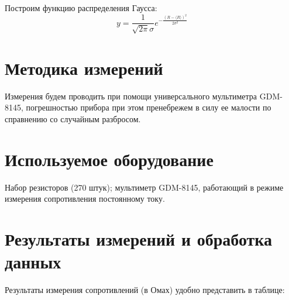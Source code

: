 \documentclass[12pt]{article}
\begin{document}
    \par Построим функцию распределения Гаусса:
    \begin{equation}
        y = \frac{1}{\sqrt{2\pi}\sigma}e^{-\frac{(R - \langle R\rangle)^2}{2\sigma^2}}
    \end{equation}

    \section{Методика измерений}
    Измерения будем проводить при помощи универсального мультиметра GDM-8145, погрешностью
    прибора при этом пренебрежем в силу ее малости по справнению со случайным разбросом.

    \section{Используемое оборудование}
    Набор резисторов (270 штук); мультиметр GDM-8145, работающий в режиме
    измерения сопротивления постоянному току.

    \section{Результаты измерений и обработка данных}
    Результаты измерения сопротивлений (в Омах) удобно представить в таблице:\\
\end{document}
